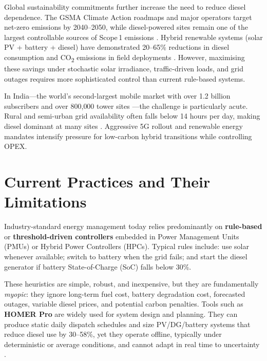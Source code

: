Global sustainability commitments further increase the need to reduce
diesel dependence. The GSMA Climate Action roadmaps and major operators
target net-zero emissions by 2040--2050, while diesel-powered sites remain
one of the largest controllable sources of Scope\,1 emissions
\citep{gsma2023}. Hybrid renewable systems (solar PV + battery + diesel)
have demonstrated 20--65\% reductions in diesel consumption and
CO\textsubscript{2} emissions in field deployments
\citep{gsma2020_tower_esco,datoms2024}. However, maximising these savings
under stochastic solar irradiance, traffic-driven loads, and grid outages
requires more sophisticated control than current rule-based systems.

In India---the world's second-largest mobile market with over
1.2 billion subscribers and over
800{,}000 tower sites \citep{dot2024_towers}---the challenge is particularly
acute. Rural and semi-urban grid availability often falls below 14 hours per
day, making diesel dominant at many sites \citep{trai2024,datoms2024}.
Aggressive 5G rollout and renewable energy mandates intensify pressure for
low-carbon hybrid transitions while controlling OPEX.


\section{Current Practices and Their Limitations}

Industry-standard energy management today relies predominantly on
\textbf{rule-based} or \textbf{threshold-driven controllers} embedded in
Power Management Units (PMUs) or Hybrid Power Controllers (HPCs). Typical
rules include: use solar whenever available; switch to battery when the grid
fails; and start the diesel generator if battery State-of-Charge (SoC) falls
below 30\%.

These heuristics are simple, robust, and inexpensive, but they are
fundamentally \emph{myopic}: they ignore long-term fuel cost, battery
degradation cost, forecasted outages, variable diesel prices, and potential
carbon penalties. Tools such as \textbf{HOMER Pro} are widely used for system
design and planning. They can produce static daily dispatch schedules and size
PV/DG/battery systems that reduce diesel use by 30--58\%, yet they operate
offline, typically under deterministic or average conditions, and cannot adapt
in real time to uncertainty \citep{homer_energy_2020,meena2020_homer_telecom}.

